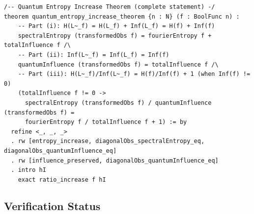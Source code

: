 \documentclass[11pt,a4paper]{article}
\theoremstyle{definition}
\theoremstyle{plain}
\begin{document}
\begin{lstlisting}[firstnumber=432]
/-- Quantum Entropy Increase Theorem (complete statement) -/
theorem quantum_entropy_increase_theorem {n : N} (f : BoolFunc n) :
    -- Part (i): H(L~_f) = H(L_f) + Inf(L_f) = H(f) + Inf(f)
    spectralEntropy (transformedObs f) = fourierEntropy f + totalInfluence f /\
    -- Part (ii): Inf(L~_f) = Inf(L_f) = Inf(f)
    quantumInfluence (transformedObs f) = totalInfluence f /\
    -- Part (iii): H(L~_f)/Inf(L~_f) = H(f)/Inf(f) + 1 (when Inf(f) != 0)
    (totalInfluence f != 0 ->
      spectralEntropy (transformedObs f) / quantumInfluence (transformedObs f) =
      fourierEntropy f / totalInfluence f + 1) := by
  refine <_, _, _>
  . rw [entropy_increase, diagonalObs_spectralEntropy_eq, diagonalObs_quantumInfluence_eq]
  . rw [influence_preserved, diagonalObs_quantumInfluence_eq]
  . intro hI
    exact ratio_increase f hI
\end{lstlisting}

\subsection{Verification Status}
\end{document}
